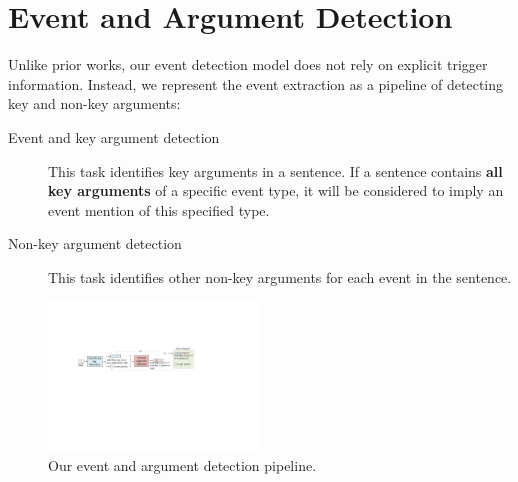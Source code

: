 \section{Event and Argument Detection}

Unlike prior works, our event detection model does not rely on explicit trigger information. Instead, we represent the event extraction as
a pipeline of detecting key and non-key arguments:

%

\begin{description}
	\item [Event and key argument detection]  This task identifies key arguments in a sentence. If a sentence contains \textbf{all key arguments} of a specific event type, it will be considered to imply an event mention of this specified type.
	\item [Non-key argument detection] This task identifies other non-key arguments for each event in the sentence.
\end{description}

\begin{figure}[t!]
  \centering
  \includegraphics[width=0.5\textwidth]{figs/model.pdf}
  \caption{Our event and argument detection pipeline.}\label{fig:model}
\end{figure}

